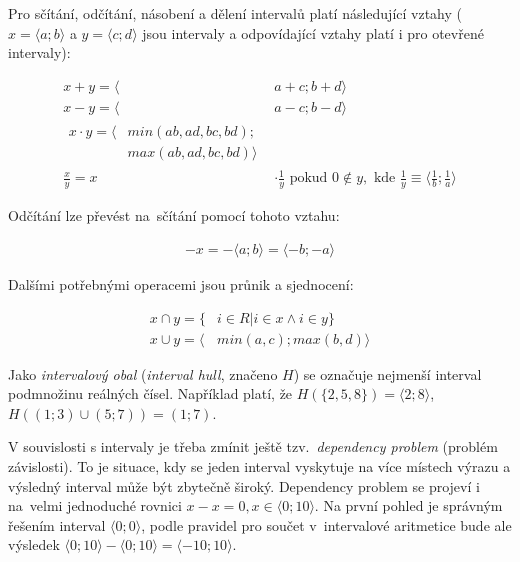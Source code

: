 Pro sčítání, odčítání, násobení a dělení intervalů platí následující vztahy ($x = \langle a; b \rangle$ a $y = \langle c; d \rangle$ jsou intervaly a odpovídající vztahy platí i pro otevřené intervaly):

\begin{subequations}
\begin{align}
   x+y = \langle & a + c;  b + d \rangle\\
   x-y = \langle & a - c;  b - d \rangle\\
   \begin{split}x  \cdot y = \langle & min(ab, ad, bc, bd); \\ & max(ab, ad, bc, bd) \rangle \end{split}\\
   \frac{x}{y} = x & \cdot \frac{1}{y} \mbox{ pokud } 0 \notin y, \mbox{ kde } \frac{1}{y} \equiv \langle  \frac{1}{b}; \frac{1}{a} \rangle
\end{align}
\end{subequations}

Odčítání lze převést na~sčítání pomocí tohoto vztahu:

\begin{subequations}
\begin{align}
   -x = - \langle a;b \rangle = \langle -b; -a \rangle
\end{align}
\end{subequations}


Dalšími potřebnými operacemi jsou průnik a sjednocení:

\begin{subequations}
\begin{align}
   x \cap y = \{ & i \in R | i \in x \wedge i \in y \} \\
   x \cup y = \langle & min(a, c); max(b, d) \rangle
\end{align}
\end{subequations}

Jako \emph{intervalový obal} (\emph{interval hull}, značeno $H$) se označuje nejmenší interval  podmnožinu reálných čísel. Například platí, že $H(\{2,5,8\}) = \langle 2; 8 \rangle$, $H((1;3) \cup (5;7)) = (1;7)$.

V souvislosti s intervaly je třeba zmínit ještě tzv.~\emph{dependency problem} (problém závislosti). To je situace, kdy se jeden interval vyskytuje na více místech výrazu a výsledný interval může být zbytečně široký. Dependency problem se projeví i na~velmi jednoduché rovnici $x - x = 0, x \in \langle 0;10 \rangle$. Na první pohled je správným řešením interval $\langle 0;0\rangle$, podle pravidel pro součet v~intervalové aritmetice bude ale výsledek $\langle 0;10 \rangle - \langle 0;10\rangle = \langle -10; 10 \rangle$.



